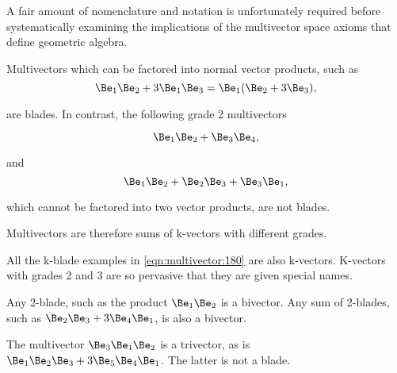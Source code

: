 %
%

A fair amount of nomenclature and notation is unfortunately required before systematically examining the implications of the multivector space axioms that define geometric algebra.

Multivectors which can be factored into normal vector products, such as
\begin{dmath}\label{eqn:multiplication:220}
\Be_1 \Be_2 + 3 \Be_1 \Be_3
=
\Be_1 (\Be_2 + 3 \Be_3),
\end{dmath}

are blades.
In contrast, the following grade 2 multivectors

\begin{dmath}\label{eqn:multiplication:240}
\Be_1 \Be_2 + \Be_3 \Be_4,
\end{dmath}

and
\begin{dmath}\label{eqn:multiplication:260}
\Be_1 \Be_2 + \Be_2 \Be_3 + \Be_3 \Be_1,
\end{dmath}

which cannot be factored into two vector products, are not blades.


Multivectors are therefore sums of k-vectors with different grades.

All the k-blade examples in 
\cref{eqn:multivector:180}
 are also k-vectors.
K-vectors with grades 2 and 3 are so pervasive that they are given special names.


Any 2-blade, such as the product \( \Be_1 \Be_2 \) is a bivector.
Any sum of 2-blades, such as \( \Be_2 \Be_3 + 3 \Be_4 \Be_1 \), is also a bivector.


The multivector \( \Be_3 \Be_1 \Be_2 \) is a trivector, as is \( \Be_1 \Be_2 \Be_3 + 3 \Be_5 \Be_4 \Be_1 \).
The latter is not a blade.


